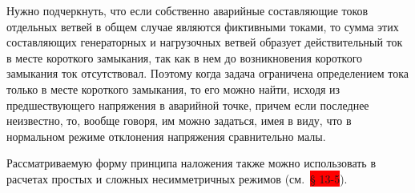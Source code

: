 Нужно подчеркнуть, что если собственно аварийные составляющие токов отдельных ветвей в общем случае являются фиктивными токами, то сумма этих составляющих генераторных и нагрузочных ветвей образует действительный ток в месте короткого замыкания, так как в нем до возникновения короткого замыкания ток отсутствовал. Поэтому когда задача ограничена определением тока только в месте короткого замыкания, то его можно найти, исходя из предшествующего напряжения в аварийной точке, причем если последнее неизвестно, то, вообще говоря, им можно задаться, имея в виду, что в нормальном режиме отклонения напряжения сравнительно малы.

Рассматриваемую форму принципа наложения также можно использовать в расчетах простых и сложных несимметричных режимов (см.~\colorbox{red}{§ 13-5}).

